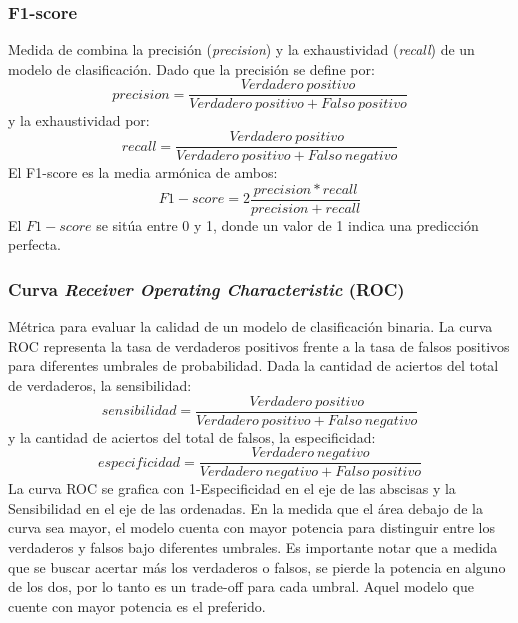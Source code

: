 \subsubsection{F1-score}
Medida de combina la precisión (\textit{precision}) y la exhaustividad (\textit{recall}) de un modelo de clasificación. Dado que la precisión se define por:
\begin{equation}
	precision = \dfrac{Verdadero\ positivo}{Verdadero\ positivo + Falso\ positivo}
\end{equation}
y la exhaustividad por:
\begin{equation}
	recall = \dfrac{Verdadero\ positivo}{Verdadero\ positivo + Falso\ negativo}
\end{equation}
El F1-score es la media armónica de ambos:
\begin{equation}
	F1-score = 2 \dfrac{precision * recall}{precision + recall}
\end{equation}
El $F1-score$ se sitúa entre 0 y 1, donde un valor de 1 indica una predicción perfecta.

\subsubsection{Curva \textit{Receiver Operating Characteristic} (ROC)}
Métrica para evaluar la calidad de un modelo de clasificación binaria. La curva ROC representa la tasa de verdaderos positivos frente a la tasa de falsos positivos para diferentes umbrales de probabilidad. Dada la cantidad de aciertos del total de verdaderos, la sensibilidad:
\begin{equation}
	sensibilidad = \dfrac{Verdadero\ positivo}{Verdadero\ positivo + Falso\ negativo}
\end{equation}
y la cantidad de aciertos del total de falsos, la especificidad:
\begin{equation}
	especificidad = \dfrac{Verdadero\ negativo}{Verdadero\ negativo + Falso\ positivo}
\end{equation}
La curva ROC se grafica con 1-Especificidad en el eje de las abscisas y la Sensibilidad en el eje de las ordenadas. En la medida que el área debajo de la curva sea mayor, el modelo cuenta con mayor potencia para distinguir entre los verdaderos y falsos bajo diferentes umbrales. Es importante notar que a medida que se buscar acertar más los verdaderos o falsos, se pierde la potencia en alguno de los dos, por lo tanto es un trade-off para cada umbral. Aquel modelo que cuente con mayor potencia es el preferido.


